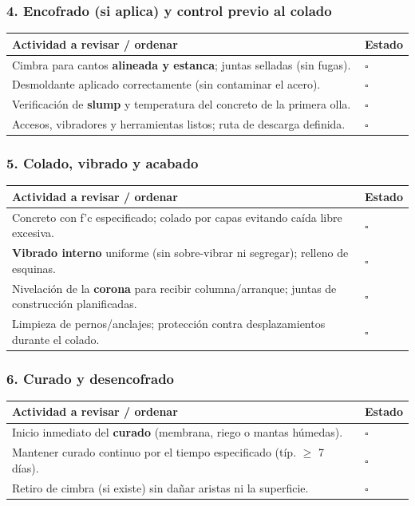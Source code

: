 \documentclass[12pt]{article}
\newcommand{\cbox}{\(\square\)}
\renewcommand{\cbox}{\(\square\)} %
\begin{document}
	\subsubsection*{4. Encofrado (si aplica) y control previo al colado}
	\begin{tabularx}{\linewidth}{>{\raggedright\arraybackslash}p{0.93\linewidth} >{\centering\arraybackslash}m{0.07\linewidth}}
		\toprule
		\textbf{Actividad a revisar / ordenar} & \textbf{Estado}\\
		\midrule
		Cimbra para cantos \textbf{alineada y estanca}; juntas selladas (sin fugas). & \cbox \\
		Desmoldante aplicado correctamente (sin contaminar el acero). & \cbox \\
		Verificación de \textbf{slump} y temperatura del concreto de la primera olla. & \cbox \\
		Accesos, vibradores y herramientas listos; ruta de descarga definida. & \cbox \\
		\bottomrule
	\end{tabularx}
	
	\subsubsection*{5. Colado, vibrado y acabado}
	\begin{tabularx}{\linewidth}{>{\raggedright\arraybackslash}p{0.93\linewidth} >{\centering\arraybackslash}m{0.07\linewidth}}
		\toprule
		\textbf{Actividad a revisar / ordenar} & \textbf{Estado}\\
		\midrule
		Concreto con f’c especificado; colado por capas evitando caída libre excesiva. & \cbox \\
		\textbf{Vibrado interno} uniforme (sin sobre-vibrar ni segregar); relleno de esquinas. & \cbox \\
		Nivelación de la \textbf{corona} para recibir columna/arranque; juntas de construcción planificadas. & \cbox \\
		Limpieza de pernos/anclajes; protección contra desplazamientos durante el colado. & \cbox \\
		\bottomrule
	\end{tabularx}
	
	\subsubsection*{6. Curado y desencofrado}
	\begin{tabularx}{\linewidth}{>{\raggedright\arraybackslash}p{0.93\linewidth} >{\centering\arraybackslash}m{0.07\linewidth}}
		\toprule
		\textbf{Actividad a revisar / ordenar} & \textbf{Estado}\\
		\midrule
		Inicio inmediato del \textbf{curado} (membrana, riego o mantas húmedas). & \cbox \\
		Mantener curado continuo por el tiempo especificado (típ. \(\geq\) 7 días). & \cbox \\
		Retiro de cimbra (si existe) sin dañar aristas ni la superficie. & \cbox \\
		\bottomrule
	\end{tabularx}
	
\end{document}
